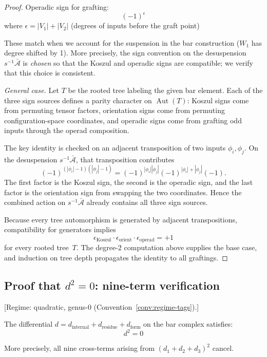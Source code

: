 \begin{proof}
Operadic sign for grafting:
\[(-1)^{\epsilon}\] where $\epsilon = |V_1| + |V_2|$ (degrees of inputs before the graft point)

These match when we account for the suspension in the bar construction ($W_1$ has degree shifted by 1). More precisely, the sign convention on the desuspension $s^{-1}\bar{\mathcal{A}}$ is \emph{chosen} so that the Koszul and operadic signs are compatible; we verify that this choice is consistent.

\emph{General case.}
Let $T$ be the rooted tree labeling the given bar element. Each of
the three sign sources defines a parity character on $\operatorname{Aut}(T)$:
Koszul signs come from permuting tensor factors, orientation signs
come from permuting configuration-space coordinates, and operadic
signs come from grafting odd inputs through the operad composition.

The key identity is checked on an adjacent transposition of two inputs
$\phi_i,\phi_j$. On the desuspension $s^{-1}\bar{\mathcal{A}}$, that
transposition contributes
\[
(-1)^{(|\phi_i|-1)(|\phi_j|-1)}
= (-1)^{|\phi_i||\phi_j|}
 (-1)^{|\phi_i|+|\phi_j|}
 (-1).
\]
The first factor is the Koszul sign, the second is the operadic sign,
and the last factor is the orientation sign from swapping the two
coordinates. Hence the combined action on
$s^{-1}\bar{\mathcal{A}}$ already contains all three sign sources.

Because every tree automorphism is generated by adjacent
transpositions, compatibility for generators implies
\[
\epsilon_{\mathrm{Koszul}} \cdot
\epsilon_{\mathrm{orient}} \cdot
\epsilon_{\mathrm{operad}} = +1
\]
for every rooted tree~$T$. The degree-$2$ computation above supplies
the base case, and induction on tree depth propagates the identity to
all graftings.
\end{proof}

\subsection{\texorpdfstring{Proof that $d^2 = 0$: nine-term verification}{Proof that d2 = 0: nine-term verification}}\label{sec:bar-nilpotency-nine-terms-complete}\label{sec:bar-nilpotency}

\begin{theorem}\label{thm:bar-nilpotency-complete}
\textup{[Regime: quadratic, genus-$0$
\textup{(}Convention~\textup{\ref{conv:regime-tags})}.]}

The differential $d = d_{\text{internal}} + d_{\text{residue}} + d_{\text{form}}$ on the bar complex satisfies:
\[d^2 = 0\]

More precisely, all nine cross-terms arising from $(d_1 + d_2 + d_3)^2$ cancel.
\end{theorem}

